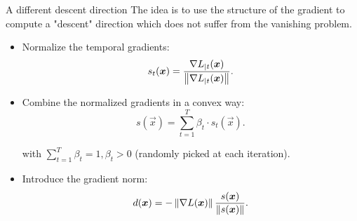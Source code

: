 \begin{frame}{A different descent direction}
	The idea is to use the structure of the gradient to compute a "descent" direction which does not suffer from the vanishing problem.
\begin{itemize}
	\item Normalize the temporal gradients:
	\begin{equation}
	s_t(\boldsymbol{x}) = \frac{\nabla L_{|t}(\boldsymbol{x})}{\left\Vert \nabla L_{|t}(\boldsymbol{x}) \right\Vert}.
	\end{equation}
	
	\item Combine the normalized gradients in a convex way:
	\begin{equation}
	s(\vec{x}) = \sum_{t=1}^T \beta_t \cdot s_t(\vec{x}).
	\end{equation}
	
	with $\sum_{t=1}^T\beta_t=1, \beta_t>0$ (randomly picked at each iteration).
	\item Introduce the gradient norm:
	\begin{equation}
	d(\boldsymbol{x}) = - \left\Vert \nabla L (\boldsymbol{x}) \right\Vert\frac{s(\boldsymbol{x})}{\left\Vert s(\boldsymbol{x}) \right\Vert}.
	\end{equation}
\end{itemize}
\end{frame}

